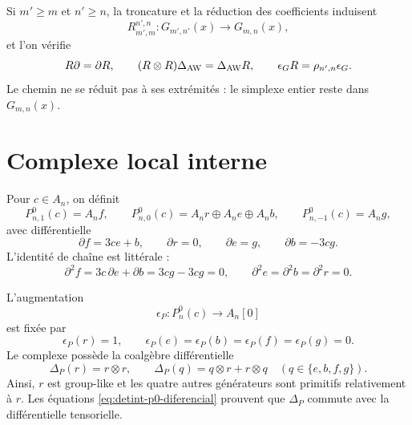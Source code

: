 Si \(m'\ge m\) et \(n'\ge n\), la troncature et la réduction des coefficients
induisent
\begin{equation}\label{eq:detint-rmn}
 R_{m',m}^{n',n}:G_{m',n'}(x)\longrightarrow G_{m,n}(x),
\end{equation}
et l'on vérifie
\begin{equation}\label{eq:detint-aw-natural}
 R\partial=\partial R,
 \qquad
 (R\otimes R)\Delta_{\rm AW}=\Delta_{\rm AW}R,
 \qquad
 \epsilon_GR=\rho_{n',n}\epsilon_G.
\end{equation}
Le chemin ne se réduit pas à ses extrémités : le simplexe entier reste dans
\(G_{m,n}(x)\).

\iffalse
\section{Complexe local interne}

Pour \(c\in A_n\), on définit
\begin{equation}\label{eq:detint-p0-grados}
 P^0_{n,1}(c)=A_nf,
 \qquad
 P^0_{n,0}(c)=A_nr\oplus A_ne\oplus A_nb,
 \qquad
 P^0_{n,-1}(c)=A_ng,
\end{equation}
avec différentielle
\begin{equation}\label{eq:detint-p0-diferencial}
 \partial f=3ce+b,
 \qquad
 \partial r=0,
 \qquad
 \partial e=g,
 \qquad
 \partial b=-3cg.
\end{equation}
L'identité de chaîne est littérale :
\begin{equation}\label{eq:detint-d2}
 \partial^2f=3c\,\partial e+\partial b=3cg-3cg=0,
 \qquad
 \partial^2e=\partial^2b=\partial^2r=0.
\end{equation}

L'augmentation
\begin{equation}\label{eq:detint-epsilon-p}
 \epsilon_P:P_n^0(c)\longrightarrow A_n[0]
\end{equation}
est fixée par
\[
 \epsilon_P(r)=1,
 \qquad
 \epsilon_P(e)=\epsilon_P(b)=\epsilon_P(f)=\epsilon_P(g)=0.
\]
Le complexe possède la coalgèbre différentielle
\begin{equation}\label{eq:detint-coalgebra-p}
 \Delta_P(r)=r\otimes r,
 \qquad
 \Delta_P(q)=q\otimes r+r\otimes q
 \quad(q\in\{e,b,f,g\}).
\end{equation}
Ainsi, \(r\) est group-like et les quatre autres générateurs sont primitifs
relativement à \(r\). Les équations
\eqref{eq:detint-p0-diferencial} prouvent que \(\Delta_P\) commute avec la
différentielle tensorielle.

